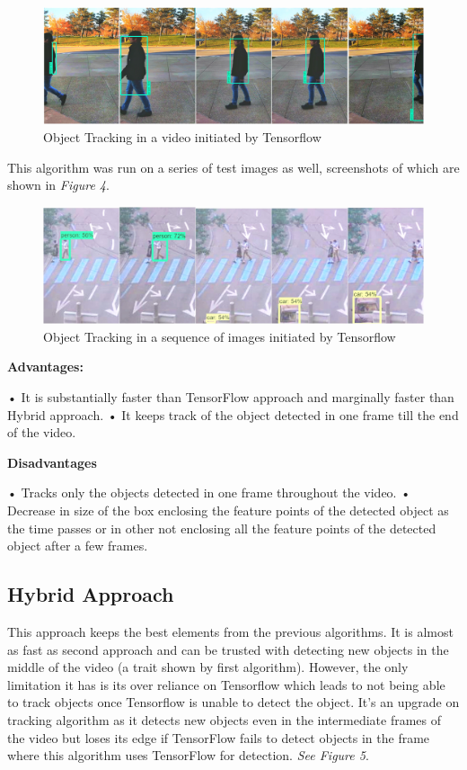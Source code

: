\documentclass[10pt,twocolumn,letterpaper]{article}
\begin{document}
\begin{figure}
\includegraphics[width=\linewidth]{Tracking.jpg}
\caption{Object Tracking in a video initiated by Tensorflow}
\end{figure}

This algorithm was run on a series of test images as well, screenshots of which are shown in \textit{Figure 4}.

\begin{figure}
\includegraphics[width=\linewidth]{Tracking_images.jpg}
\caption{Object Tracking in a sequence of images initiated by Tensorflow}
\end{figure}

\textbf{Advantages:}

•	It is substantially faster than TensorFlow approach and marginally faster than Hybrid approach.
•	It keeps track of the object detected in one frame till the end of the video.

\textbf{Disadvantages}

•	Tracks only the objects detected in one frame throughout the video.
•	Decrease in size of the box enclosing the feature points of the detected object as the time passes or in other not enclosing all the feature points of the detected object after a few frames.
 
\subsection{Hybrid Approach}  

This approach keeps the best elements from the previous algorithms. It is almost as fast as second approach and can be trusted with detecting new objects in the middle of the video (a trait shown by first algorithm). However, the only limitation it has is its over reliance on Tensorflow which leads to not being able to track objects once Tensorflow is unable to detect the object. It’s an upgrade on tracking algorithm as it detects new objects even in the intermediate frames of the video but loses its edge if TensorFlow fails to detect objects in the frame where this algorithm uses TensorFlow for detection. \textit{See Figure 5}.
\end{document}
